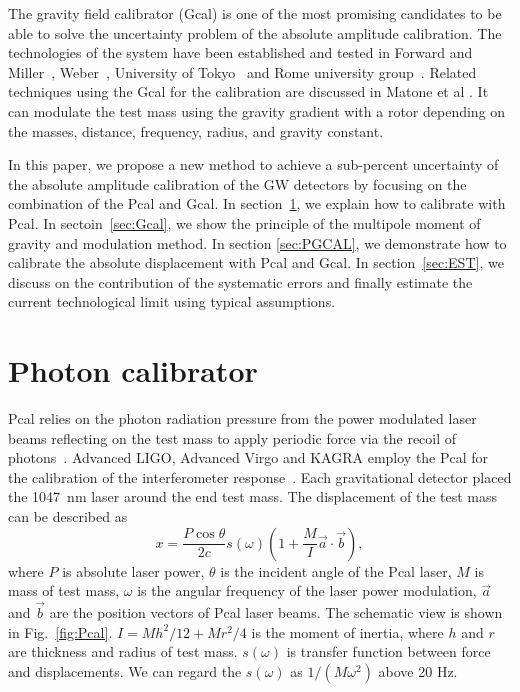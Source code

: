 \documentclass[%
 reprint,
superscriptaddress,
 amsmath,amssymb,
 aps,
]{revtex4-1}
\begin{document}
The gravity field calibrator (Gcal) is one of the most promising candidates to be able to solve the uncertainty problem of the absolute amplitude calibration. The technologies of the system have been established and tested in Forward and Miller~\cite{doi:10.1063/1.1709366}, Weber~\cite{PhysRevLett.18.795,PhysRev.167.1145}, University of Tokyo~\cite{Hirakawa,1347-4065-19-3-L123,1347-4065-20-7-L498,PhysRevD.26.729,PhysRevD.32.342} and Rome university group~\cite{Astone1991}. Related techniques using the Gcal for the calibration are discussed in Matone et al \cite{0264-9381-24-9-005}. It can modulate the test mass using the gravity gradient with a rotor depending on the masses, distance, frequency, radius, and gravity constant. 

In this paper, we propose a new method to achieve a sub-percent uncertainty of the absolute amplitude calibration of the GW detectors by focusing on the combination of the Pcal and Gcal.
In section~\ref{sec:Pcal}, we explain how to calibrate with Pcal. In sectoin~\ref{sec:Gcal}, we show the principle of the multipole moment of gravity and modulation method.
In section \ref{sec:PGCAL}, we demonstrate how to calibrate the absolute displacement with Pcal and Gcal. In section~\ref{sec:EST}, we discuss on the contribution of the systematic errors and finally estimate the current technological limit using typical assumptions. 

\section{Photon calibrator} \label{sec:Pcal}
Pcal relies on the photon radiation pressure from the power modulated laser beams reflecting on the test mass to apply periodic force via the recoil of photons~\cite{doi:10.1063/1.4967303}. 
Advanced LIGO, Advanced Virgo and KAGRA employ the Pcal for the calibration of the interferometer response~\cite{0264-9381-34-1-015002, KAGRA_Pcal,0264-9381-32-2-024001}. Each gravitational detector placed the 1047~nm laser around the end test mass. The displacement of the test mass can be described as
\begin{equation}
 x = \frac{P \cos{\theta}}{2c} s(\omega)\left(1+\frac{M}{I}\vec{a} \cdot \vec{b} \right) , \label{eq:pcal}
\end{equation}
where $P$ is absolute laser power, $\theta$ is the incident angle of the Pcal laser, $M$ is  mass of test mass, $\omega$ is the angular frequency of the laser power modulation, $\vec{a}$ and $\vec{b}$ are the position vectors of Pcal laser beams. The schematic view is shown in Fig.~\ref{fig:Pcal}. $I=Mh^2/12+Mr^2/4$ is the moment of inertia, where $h$ and  $r$ are thickness and radius of test mass. $s(\omega)$ is transfer function between force and displacements. We can regard the $s(\omega)$ as $1/(M \omega^2)$ above 20 Hz. 
\end{document}
